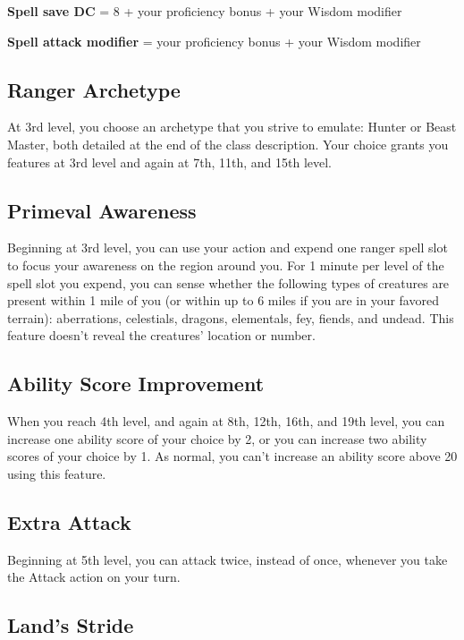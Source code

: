 \textbf{Spell save DC} = 8 + your proficiency bonus + your Wisdom modifier

\textbf{Spell attack modifier} = your proficiency bonus + your Wisdom modifier

\subsection{Ranger Archetype}

At 3rd level, you choose an archetype that you strive to emulate: Hunter or Beast Master, both detailed at the end of the class description. Your choice grants you features at 3rd level and again at 7th, 11th, and 15th level.

\subsection{Primeval Awareness}

Beginning at 3rd level, you can use your action and expend one ranger spell slot to focus your awareness on the region around you. For 1 minute per level of the spell slot you expend, you can sense whether the following types of creatures are present within 1 mile of you (or within up to 6 miles if you are in your favored terrain): aberrations, celestials, dragons, elementals, fey, fiends, and undead. This feature doesn’t reveal the creatures’ location or number.

\subsection{Ability Score Improvement}

When you reach 4th level, and again at 8th, 12th, 16th, and 19th level, you can increase one ability score of your choice by 2, or you can increase two ability scores of your choice by 1. As normal, you can’t increase an ability score above 20 using this feature.

\subsection{Extra Attack}

Beginning at 5th level, you can attack twice, instead of once, whenever you take the Attack action on your turn.

\subsection{Land’s Stride}


